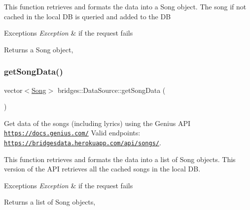 This function retrieves and formats the data into a Song object. The song if not cached in the local DB is queried and added to the DB


\begin{DoxyExceptions}{Exceptions}
{\em Exception} & if the request fails\\
\hline
\end{DoxyExceptions}
\begin{DoxyReturn}{Returns}
a Song object, 
\end{DoxyReturn}
\mbox{\label{classbridges_1_1_data_source_a5e8d035a1becf96c71569e0966e93849}} 
\subsubsection{\texorpdfstring{get\+Song\+Data()}{getSongData()}}
{\footnotesize\ttfamily vector$<$\hyperlink{classbridges_1_1dataset_1_1_song}{Song}$>$ bridges\+::\+Data\+Source\+::get\+Song\+Data (\begin{DoxyParamCaption}{ }\end{DoxyParamCaption})\hspace{0.3cm}{\ttfamily [inline]}}



Get data of the songs (including lyrics) using the Genius A\+PI \href{https://docs.genius.com/}{\tt https\+://docs.\+genius.\+com/} Valid endpoints\+: \href{https://bridgesdata.herokuapp.com/api/songs/}{\tt https\+://bridgesdata.\+herokuapp.\+com/api/songs/}. 

This function retrieves and formats the data into a list of Song objects. This version of the A\+PI retrieves all the cached songs in the local DB.


\begin{DoxyExceptions}{Exceptions}
{\em Exception} & if the request fails\\
\hline
\end{DoxyExceptions}
\begin{DoxyReturn}{Returns}
a list of Song objects, 
\end{DoxyReturn}
\mbox{\label{classbridges_1_1_data_source_a25b33736b4ae9ffea5fe4ebf5dbb3a63}} 
